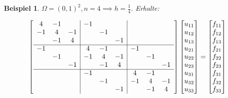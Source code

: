 \documentclass{book}
\newtheorem{example}[algorithm]{Beispiel}
\begin{document}
            \begin{example}\label{b3.1}
                $\Omega=(0,1)^2,n=4\implies h=\frac{1}{4}$. Erhalte:

                \[
                    \left[
                        \begin{array}{ccc|ccc|ccc}
                            4 & -1 & &-1 & & & & & \\
                            -1 & 4 & -1 & & -1 & & & & \\
                            & -1 & 4 & & & -1 & & & \\ \cline{1-9}
                            -1 & & &  4 & -1 & & -1 & & \\
                            & -1 & &  -1 & 4 & -1 & &-1 &\\
                            & & -1 & & -1 & 4 & & &  -1\\\cline{1-9}
                            & & & -1 & & & 4 & -1 & \\
                            & & & & -1 & & -1 & 4 & -1 \\
                            & & & & & -1 & & -1 & 4  
                        \end{array}  
                    \right]
                    \begin{bmatrix}
                        u_{11}\\
                        u_{12}\\
                        u_{13}\\
                        u_{21}\\
                        u_{22}\\
                        u_{23}\\
                        u_{31}\\
                        u_{32}\\
                        u_{33}
                    \end{bmatrix} = 
                    \begin{bmatrix}
                        f_{11}\\
                        f_{12}\\
                        f_{13}\\
                        f_{21}\\
                        f_{22}\\
                        f_{23}\\
                        f_{31}\\
                        f_{32}\\
                        f_{33}
                    \end{bmatrix}
                \]
            \end{example}
\end{document}
